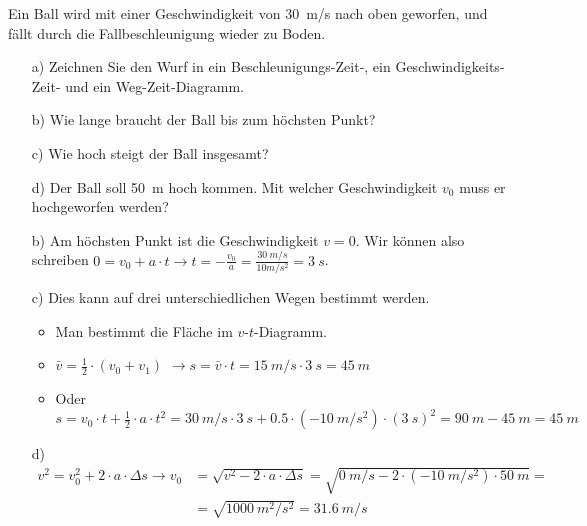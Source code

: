 

\begin{aufgabe}
Ein Ball wird mit einer Geschwindigkeit von \SI{30}{m/s} nach oben geworfen, und fällt
durch die Fallbeschleunigung wieder zu Boden.
\begin{itemize}
	\item[a)] Zeichnen Sie den Wurf in ein Beschleunigungs-Zeit-, ein Geschwindigkeits-Zeit- und ein Weg-Zeit-Diagramm.
	\item[b)] Wie lange braucht der Ball bis zum höchsten Punkt?
	\item[c)] Wie hoch steigt der Ball insgesamt?
	\item[d)] Der Ball soll \SI{50}{m} hoch kommen. Mit welcher Geschwindigkeit $v_0$ muss er hochgeworfen werden?
\end{itemize}


\begin{loesung}
\begin{itemize}
	\item[b)] Am höchsten Punkt ist die Geschwindigkeit $v=0$. Wir können also schreiben $0 = v_0 + a\cdot t \to t=-\frac{v_0}{a}=\frac{\SI{30}{m/s}}{{10}{m/s^2}}=\SI{3}{s}$.

	\item[c)] Dies kann auf drei unterschiedlichen Wegen bestimmt werden. 
\begin{itemize}
	\item Man bestimmt die Fläche im $v$-$t$-Diagramm.
	\item $\bar{v}=\frac{1}{2}\cdot (v_0+v_1)$ $\to s=\bar{v}\cdot t=\SI{15}{m/s}\cdot\SI{3}{s}=\SI{45}{m}$
	\item Oder $s=v_0\cdot t +\frac{1}{2}\cdot a \cdot t^2 = \SI{30}{m/s}\cdot\SI{3}{s}+0.5\cdot(\SI{-10}{m/s^2})\cdot(\SI{3}{s})^2=\SI{90}{m}-\SI{45}{m}=\SI{45}{m}$
\end{itemize}
	\item[d)]
		\begin{align*}
		v^2=v_0^2 + 2\cdot a \cdot \Delta s \to v_0 &= \sqrt{v^2 - 2\cdot a \cdot \Delta s}=\sqrt{\SI{0}{m/s} - 2\cdot (\SI{-10}{m/s^2})\cdot\SI{50}{m}}=\\
			&=\sqrt{\SI{1000}{m^2/s^2}}=\SI{31.6}{m/s}
		\end{align*}
\end{itemize}


\end{loesung}
\end{aufgabe}
